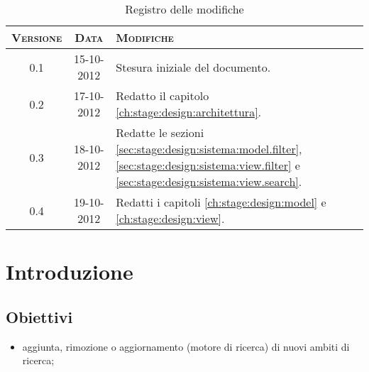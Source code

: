 \documentclass[10pt,a4paper,headinclude,footinclude,hidelinks]{scrreprt} %
\begin{document}
    \title{\rmfamily\normalfont{}}
    \author{}
    \date{\today}
    
    \maketitle
    
    \begin{abstract}
        \noindent Il documento riporta le informazioni di progettazione riguardanti l'interfaccia grafica per la visualizzazione e la navigazione dei contenuti.
    \end{abstract}
    
	\begin{table}[ht]
	\centering
	\begin{tabular}{|c|c|l|}
	\hline
	\textsc{Versione} & \textsc{Data} & \textsc{Modifiche} \\ \hline
	0.1 & 15-10-2012 & Stesura iniziale del documento. \\ \hline
	0.2 & 17-10-2012 & Redatto il capitolo \ref{ch:stage:design:architettura}. \\ \hline
	0.3 & 18-10-2012 & Redatte le sezioni \ref{sec:stage:design:sistema:model.filter}, \ref{sec:stage:design:sistema:view.filter} e \ref{sec:stage:design:sistema:view.search}. \\ \hline
	0.4 & 19-10-2012 & Redatti i capitoli \ref{ch:stage:design:model} e \ref{ch:stage:design:view}. \\ \hline
	\end{tabular}
	\caption{Registro delle modifiche}
	\label{tab:stage:wp:workload}
	\end{table}

	\tableofcontents

	\chapter{Introduzione}
	\label{ch:stage:design:intro}

	\section{Obiettivi}
	\begin{itemize}
	\item aggiunta, rimozione o aggiornamento (motore di ricerca) di nuovi ambiti di ricerca;
	\end{itemize}
\end{document}
